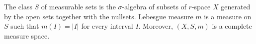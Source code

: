 \begin{theorem}[Theorem 3.16]
The class $S$ of measurable sets is the $\sigma$-algebra of subsets of $r$-space $X$ generated by the open sets together with the nullsets. Lebesgue measure $m$ is a measure on $S$ such that $m(I) = |I|$ for every interval $I$. Moreover, $(X, S, m)$ is a complete measure space.
\end{theorem}
